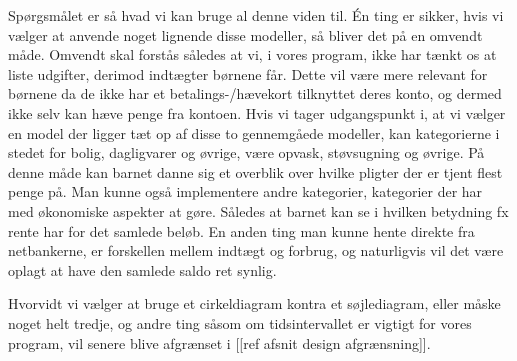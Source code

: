 Spørgsmålet er så hvad vi kan bruge al denne viden til. Én ting er sikker, hvis vi vælger at anvende noget lignende disse modeller, så bliver det på en omvendt måde. Omvendt skal forstås således at vi, i vores program, ikke har tænkt os at liste udgifter, derimod indtægter børnene får. Dette vil være mere relevant for børnene da de ikke har et betalings-/hævekort tilknyttet deres konto, og dermed ikke selv kan hæve penge fra kontoen. Hvis vi tager udgangspunkt i, at vi vælger en model der ligger tæt op af disse to gennemgåede modeller, kan kategorierne i stedet for bolig, dagligvarer og øvrige, være opvask, støvsugning og øvrige. På denne måde kan barnet danne sig et overblik over hvilke pligter der er tjent flest penge på. Man kunne også implementere andre kategorier, kategorier der har med økonomiske aspekter at gøre. Således at barnet kan se i hvilken betydning fx rente har for det samlede beløb. En anden ting man kunne hente direkte fra netbankerne, er forskellen mellem indtægt og forbrug, og naturligvis vil det være oplagt at have den samlede saldo ret synlig. 

Hvorvidt vi vælger at bruge et cirkeldiagram kontra et søjlediagram, eller måske noget helt tredje, og andre ting såsom om tidsintervallet er vigtigt for vores program, vil senere blive afgrænset i [[ref afsnit design afgrænsning]].


















